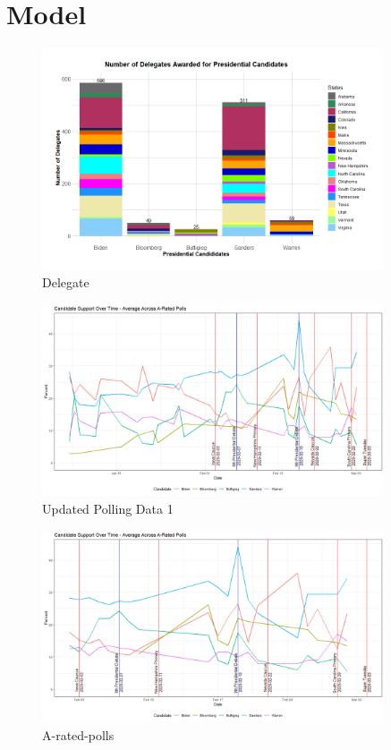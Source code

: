 \section{Model}\label{model}
\begin{figure}[H]
    \centering
    \includegraphics[width=0.9\textwidth]{figures/Delegate.png}
    \caption{Delegate}
    \label{Delegate}
\end{figure}
\begin{figure}[H]
    \centering
    \includegraphics[width=0.9\textwidth]{figures/long-A-rated-polls.png}
    \caption{Updated Polling Data 1 }
    \label{Updated-Polling-Data-1}
\end{figure}
\begin{figure}[H]
    \centering
    \includegraphics[width=0.9\textwidth]{figures/A-rated-polls.png}
    \caption{A-rated-polls}
    \label{A-rated-polls}
\end{figure}

